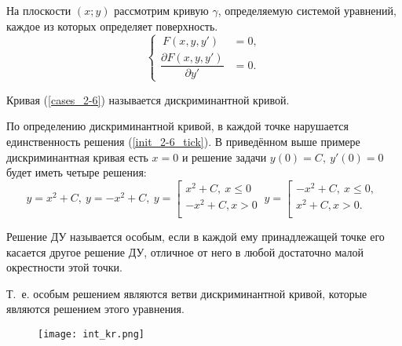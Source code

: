 На плоскости $(x; y)$ рассмотрим кривую $\gamma$, определяемую системой уравнений, каждое из которых определяет поверхность.
\begin{equation}\label{cases_2-6}
    \begin{cases}
        \ F(x, y, y') & = 0, \\
        \dfrac{\partial F(x, y, y')}{\partial y'} & = 0.
    \end{cases}
\end{equation}
\begin{definition}
    Кривая (\ref{cases_2-6}) называется дискриминантной кривой.
\end{definition}
\begin{remark}
    По определению дискриминантной кривой, в каждой точке нарушается единственность решения (\ref{init_2-6_tick}). В приведённом выше примере дискриминантная кривая есть $x = 0$ и решение задачи $y(0) = C,\ y'(0) = 0$ будет иметь четыре решения:
    \begin{equation*}
        y = x^2 + C,\ y = -x^2 + C,\ 
        y = 
        \left[ 
            \begin{gathered} 
                x^2 + C,\ x \leqslant 0\\
                -x^2 + C, x > 0\\ 
            \end{gathered} 
        \right.\
        y = 
        \left[ 
            \begin{gathered} 
                -x^2 + C,\ x \leqslant 0,\\
                x^2 + C, x > 0.\\ 
            \end{gathered} 
        \right.\
    \end{equation*}
\end{remark}
\begin{definition}
    Решение ДУ называется особым, если в каждой ему принадлежащей точке его касается другое решение ДУ, отличное от него в любой достаточно малой окрестности этой точки.
\end{definition}
\begin{remark}
    Т.\ е. особым решением являются ветви дискриминантной кривой, которые являются решением этого уравнения.
    
    \begin{figure}
        \centering
        \texttt{[image: int\_kr.png]}
    \end{figure}
\end{remark}
